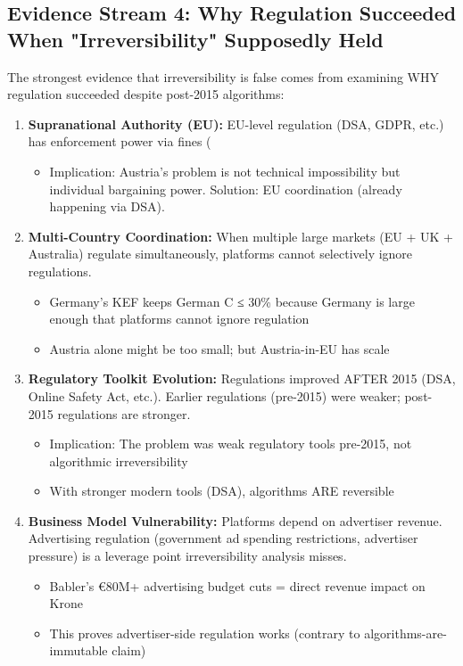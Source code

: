 \subsection*{Evidence Stream 4: Why Regulation Succeeded When "Irreversibility" Supposedly Held}

The strongest evidence that irreversibility is false comes from examining WHY regulation succeeded despite post-2015 algorithms:

\begin{enumerate}
\item \textbf{Supranational Authority (EU):} EU-level regulation (DSA, GDPR, etc.) has enforcement power via fines (%
  \begin{itemize}
  \item Implication: Austria's problem is not technical impossibility but individual bargaining power. Solution: EU coordination (already happening via DSA).
  \end{itemize}

\item \textbf{Multi-Country Coordination:} When multiple large markets (EU + UK + Australia) regulate simultaneously, platforms cannot selectively ignore regulations.
  \begin{itemize}
  \item Germany's KEF keeps German C ≤ 30\% because Germany is large enough that platforms cannot ignore regulation
  \item Austria alone might be too small; but Austria-in-EU has scale
  \end{itemize}

\item \textbf{Regulatory Toolkit Evolution:} Regulations improved AFTER 2015 (DSA, Online Safety Act, etc.). Earlier regulations (pre-2015) were weaker; post-2015 regulations are stronger.
  \begin{itemize}
  \item Implication: The problem was weak regulatory tools pre-2015, not algorithmic irreversibility
  \item With stronger modern tools (DSA), algorithms ARE reversible
  \end{itemize}

\item \textbf{Business Model Vulnerability:} Platforms depend on advertiser revenue. Advertising regulation (government ad spending restrictions, advertiser pressure) is a leverage point irreversibility analysis misses.
  \begin{itemize}
  \item Babler's €80M+ advertising budget cuts = direct revenue impact on Krone
  \item This proves advertiser-side regulation works (contrary to algorithms-are-immutable claim)
  \end{itemize}
\end{enumerate}

